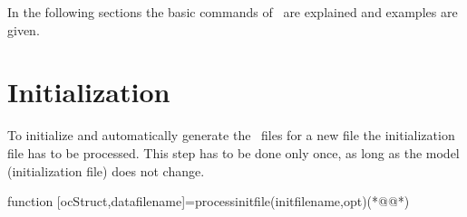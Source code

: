 In the following sections the basic commands of \OCMAT\ are explained and examples are given.

\section{Initialization}
To initialize and automatically generate the \MATL\ files for a new file the initialization file has to be processed. This step has to be done only once, as long as the model (initialization file) does not change.
\begin{matlab}
function [ocStruct,datafilename]=processinitfile(initfilename,opt)(*@@*)
%
%
%
%
\end{matlab}


